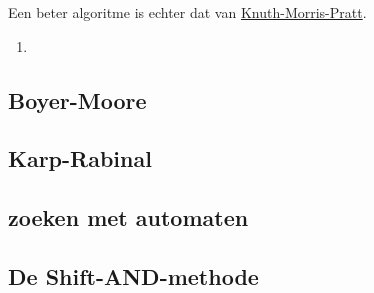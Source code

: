 \documentclass{report}
\begin{document}
Een beter algoritme is echter dat van \underline{Knuth-Morris-Pratt}.
\begin{enumerate}
	\item 
\end{enumerate}



\subsection{Boyer-Moore}

\subsection{Karp-Rabinal}

\subsection{zoeken met automaten}

\subsection{De Shift-AND-methode}
\end{document}
